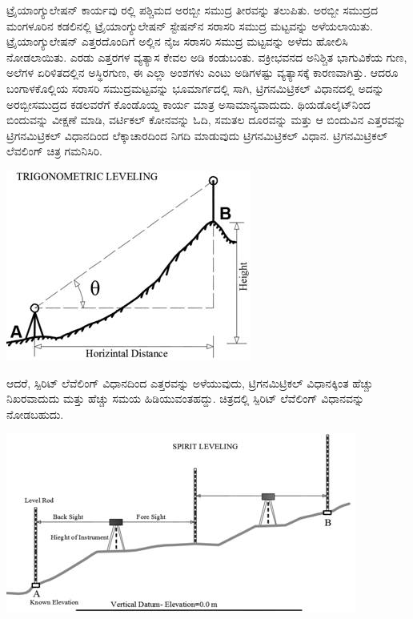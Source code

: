 ಟ್ರೈಯಾಂಗ್ಯುಲೇಷನ್​ ಕಾರ್ಯವು  ರಲ್ಲಿ ಪಶ್ಚಿಮದ ಅರಬ್ಬೀ ಸಮುದ್ರ ತೀರವನ್ನು ತಲುಪಿತು. ಅರಬ್ಬೀ ಸಮುದ್ರದ ಮಂಗಳೂರಿನ ಕಡಲಿನಲ್ಲಿ ಟ್ರೈಯಾಂಗ್ಯುಲೇಷನ್​ ಸ್ಟೇಷನ್​ನ ಸರಾಸರಿ ಸಮುದ್ರ ಮಟ್ಟವನ್ನು ಅಳೆಯಲಾಯಿತು. ಟ್ರೈಯಾಂಗ್ಯುಲೇಷನ್​ ಎತ್ತರದೊಂದಿಗೆ ಅಲ್ಲಿನ ನೈಜ ಸರಾಸರಿ ಸಮುದ್ರ ಮಟ್ಟವನ್ನು ಅಳೆದು ಹೋಲಿಸಿ ನೋಡಲಾಯಿತು. ಎರಡು ಎತ್ತರಗಳ ವ್ಯತ್ಯಾಸ ಕೇವಲ  ಅಡಿ ಕಂಡುಬಂತು. ವಕ್ರೀಭವನದ ಅನಿಶ್ಚಿತ ಭಾಗುವಿಕೆಯ ಗುಣ, ಅಲೆಗಳ ಏರಿಳಿತದಲ್ಲಿನ ಅಸ್ಥಿರಗುಣ, ಈ ಎಲ್ಲಾ ಅಂಶಗಳು ಎಂಟು ಅಡಿಗಳಷ್ಟು ವ್ಯತ್ಯಾಸಕ್ಕೆ ಕಾರಣವಾಗಿತ್ತು. ಆದರೂ ಬಂಗಾಳಕೊಲ್ಲಿಯ ಸರಾಸರಿ ಸಮುದ್ರಮಟ್ಟವನ್ನು ಭೂಮಾರ್ಗದಲ್ಲಿ ಸಾಗಿ, ಟ್ರಿಗನಮಿಟ್ರಿಕಲ್​ ವಿಧಾನದಲ್ಲಿ ಅದನ್ನು ಅರಬ್ಬೀಸಮುದ್ರದ ಕಡಲವರೆಗೆ ಕೊಂಡೊಯ್ದ ಕಾರ್ಯ ಮಾತ್ರ ಅಸಾಮಾನ್ಯವಾದುದು. ಥಿಯಡೊಲೈಟ್​ನಿಂದ ಬಿಂದುವನ್ನು ವೀಕ್ಷಣೆ ಮಾಡಿ, ವರ್ಟಿಕಲ್​ ಕೋನವನ್ನು ಓದಿ, ಸಮತಲ ದೂರವನ್ನು ಮತ್ತು ಆ ಬಿಂದುವಿನ ಎತ್ತರವನ್ನು ಟ್ರಿಗನಮಿಟ್ರಿಕಲ್​ ವಿಧಾನದಿಂದ ಲೆಕ್ಕಾಚಾರದಿಂದ ನಿಗದಿ ಮಾಡುವುದು ಟ್ರಿಗನಮಿಟ್ರಿಕಲ್​ ವಿಧಾನ. ಟ್ರಿಗನಮಿಟ್ರಿಕಲ್​ ಲೆವಲಿಂಗ್​ ಚಿತ್ರ ಗಮನಿಸಿರಿ.

\begin{center}
\includegraphics[scale=0.6]{"images/image010.jpg"}
\end{center}

ಆದರೆ, ಸ್ಪಿರಿಟ್​ ಲೆವೆಲಿಂಗ್​ ವಿಧಾನದಿಂದ ಎತ್ತರವನ್ನು ಅಳೆಯುವುದು, ಟ್ರಿಗನಮಿಟ್ರಿಕಲ್​ ವಿಧಾನಕ್ಕಿಂತ ಹೆಚ್ಚು ನಿಖರವಾದುದು ಮತ್ತು ಹೆಚ್ಚು ಸಮಯ ಹಿಡಿಯುವಂತಹದ್ದು. ಚಿತ್ರದಲ್ಲಿ ಸ್ಪಿರಿಟ್​ ಲೆವೆಲಿಂಗ್​ ವಿಧಾನವನ್ನು ನೋಡಬಹುದು.

\begin{center}
\includegraphics[scale=0.6]{"images/image011.jpg"}
\end{center}

